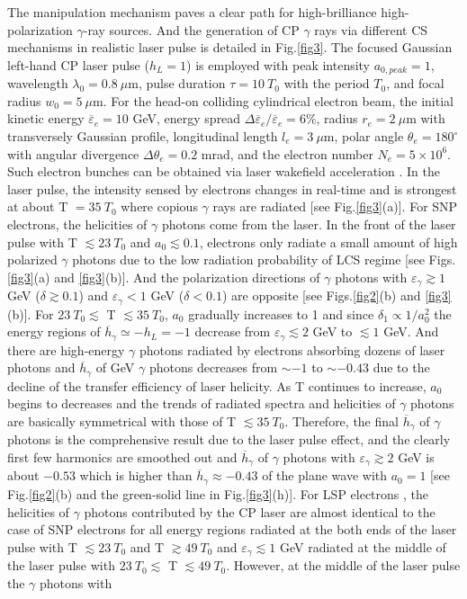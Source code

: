 \documentclass[10pt,twocolumn,showpacs,amsmath,amssymb,floatfix,superscriptaddress]{revtex4-2}
\begin{document}
The manipulation mechanism paves a clear path for high-brilliance high-polarization $\gamma$-ray sources. And the generation of CP $\gamma$ rays via different CS mechanisms in realistic laser pulse is detailed in Fig.\ref{fig3}. The focused Gaussian left-hand CP laser pulse ($h_L=1$) is employed with peak intensity $a_{0,peak}=1$, wavelength $\lambda_0 = 0.8 ~ \mu$m, pulse duration $\tau=10~T_0$ with the period $T_0$, and focal radius $w_0=5 ~ \mu$m. For the head-on colliding cylindrical electron beam, the initial kinetic energy $\overline{\varepsilon}_e=10$ GeV, energy spread $\Delta \overline{\varepsilon}_e / \overline{\varepsilon}_e=6\%$, radius $r_e = 2 ~ \mu$m with transversely Gaussian profile, longitudinal length $l_e = 3 ~ \mu$m, polar angle $\theta_e=180^\circ$ with angular divergence $\Delta \theta_e=0.2$ mrad, and the electron number $N_e=5\times10^6$. Such electron bunches can be obtained via laser wakefield acceleration \cite{Leemans2014,Xia2016,Gonsalves2019,LiF2022}. In the laser pulse, the intensity sensed by electrons changes in real-time and is strongest at about T $=35~T_0$ where copious $\gamma$ rays are radiated [see Fig.\ref{fig3}(a)].  For SNP electrons, the helicities of $\gamma$ photons come from the laser. In the front of the laser pulse with T $\lesssim 23~T_0$ and $a_0 \lesssim 0.1$, electrons only radiate a small amount of high polarized $\gamma$ photons due to the low radiation probability of LCS regime [see Figs.\ref{fig3}(a) and \ref{fig3}(b)]. And the polarization directions of $\gamma$ photons with $\varepsilon_\gamma \gtrsim 1$ GeV ($\delta \gtrsim 0.1$) and $\varepsilon_\gamma < 1$ GeV ($\delta < 0.1$) are opposite [see Figs.\ref{fig2}(b) and \ref{fig3}(b)]. For $23~T_0 \lesssim$ T $\lesssim 35~T_0$, $a_0$ gradually increases to 1 and since $\delta_1 \propto 1/a_0^2$ the energy regions of $\overline{h}_\gamma \simeq -h_L =-1$ decrease from $\varepsilon_\gamma \lesssim 2$ GeV to $\lesssim 1$ GeV. And there are high-energy $\gamma$ photons radiated by electrons absorbing dozens of laser photons and $\overline{h}_\gamma$ of GeV $\gamma$ photons decreases from $\sim -1$ to $\sim -0.43$ due to the decline of the transfer efficiency of laser helicity. As T continues to increase, $a_0$ begins to decreases and the trends of radiated spectra and helicities of $\gamma$ photons are basically symmetrical with those of T $\lesssim 35~T_0$. Therefore, the final $\overline{h}_\gamma$ of $\gamma$ photons is the comprehensive result due to the laser pulse effect, and the clearly first few harmonics are smoothed out and $\overline{h}_\gamma$ of $\gamma$ photons with $\varepsilon_{\gamma} \gtrsim 2$ GeV is about $-0.53$ which is higher than $\overline{h}_\gamma \approx -0.43$ of the plane wave with $a_0=1$ [see Fig.\ref{fig2}(b) and the green-solid line in Fig.\ref{fig3}(h)]. For LSP electrons \cite{Wen2019,Nie2021,Sun2022}, the helicities of $\gamma$ photons contributed by the CP laser are almost identical to the case of SNP electrons for all energy regions radiated at the both ends of the laser pulse with T $\lesssim 23~T_0$ and T $\gtrsim 49~T_0$ and $\varepsilon_\gamma \lesssim 1$ GeV radiated at the middle of the laser pulse with $23~T_0 \lesssim$ T $\lesssim 49~T_0$. However, at the middle of the laser pulse the $\gamma$ photons with 
\end{document}
